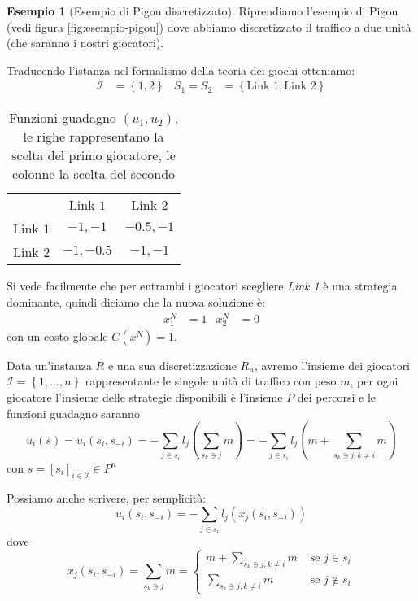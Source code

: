 \documentclass[a4paper]{article}
\newcounter{counter1}
\theoremstyle{plain}
\theoremstyle{definition}
\newtheorem{myes}[counter1]{Esempio}
\theoremstyle{remark}
\newcommand{\set}[1]{\left\{#1\right\}}
\newcommand{\pa}[1]{\left(#1\right)}
\newcommand{\bra}[1]{\left[#1\right]}
\begin{document}
\begin{myes}[Esempio di Pigou discretizzato]
\label{es:pigou-nash}
  Riprendiamo l'esempio di Pigou (vedi figura \ref{fig:esempio-pigou})
  dove abbiamo discretizzato il traffico a due unità (che saranno i
  nostri giocatori).

  Traducendo l'istanza nel formalismo della teoria dei giochi
  otteniamo:
  \begin{align*}
    \mathcal{I} &= \set{1,2} & S_1 = S_2 & = \set{\text{Link 1},
                                           \text{Link 2}}
  \end{align*}
  \begin{table}[!ht]
    \centering
    \begin{tabular}{rcc}
      & Link $1$ & Link $2$ \\
      \cline{2-3}
      Link $1$ & \multicolumn{1}{|c|}{$-1,-1$} & \multicolumn{1}{|c|}{$-0.5,-1$}  \\
      \cline{2-3}
      Link $2$ & \multicolumn{1}{|c|}{$-1,-0.5$} & \multicolumn{1}{|c|}{$-1,-1$}  \\
      \cline{2-3}
    \end{tabular}
    \caption{Funzioni guadagno $(u_1,u_2)$, le righe rappresentano la
      scelta del primo giocatore, le colonne la scelta del secondo}
    \label{tab:pigou-nash}
  \end{table}

  Si vede facilmente che per entrambi i giocatori scegliere
  \textit{Link 1} è una strategia dominante, quindi diciamo che la
  nuova soluzione è:
  \begin{align*}
    x^{N}_1 &= 1 & x^{N}_2 &= 0
  \end{align*}
  con un costo globale $C\pa{x^{N}} = 1$.
\end{myes}

Data un'instanza $R$ e una sua discretizzazione $R_n$, avremo
l'insieme dei giocatori $\mathcal{I} = \set{1,...,n}$ rappresentante
le singole unità di traffico con peso $m$, per ogni giocatore
l'insieme delle strategie disponibili è l'insieme $P$ dei percorsi e
le funzioni guadagno saranno
\[ u_i \pa{s} = u_i\pa{s_i, s_{-i}} = - \sum _{j\in s_i}
  l_j\pa{\sum_{s_k\ni j} m} = -\sum _{j\in s_i} l_j\pa{m + \sum_{s_k\ni
      j,k\neq i} m} \]
con $s = \bra{s_i}_{i\in\mathcal{I}} \in P^n$

Possiamo anche scrivere, per semplicità:
\[ u_i\pa{s_i, s_{-i}} = - \sum _{j\in s_i} l_j\pa{x_j\pa{s_i, s_{-i}}} \]
dove
\[ x_j\pa{s_i,s_{-i}} = \sum_{s_k\ni j} m = \left\{ 
    \begin{matrix}
      m + \sum_{s_k\ni j,k\neq i} m & \text{ se } j\in s_i \\
      \sum_{s_k\ni j,k\neq i} m & \text{ se } j\not\in s_i
    \end{matrix}
  \right.
\]
\end{document}
